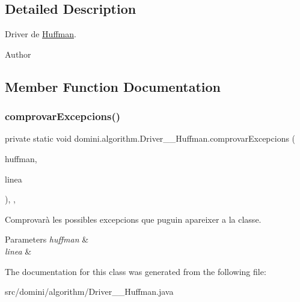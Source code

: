 \subsection{Detailed Description}
Driver de \hyperlink{classdomini_1_1algorithm_1_1Huffman}{Huffman}. 

\begin{DoxyAuthor}{Author}

\end{DoxyAuthor}


\subsection{Member Function Documentation}
\mbox{\label{classdomini_1_1algorithm_1_1Driver____Huffman_a5d56f18f1d8f96dfc735b9a127094319}} 
\subsubsection{\texorpdfstring{comprovar\+Excepcions()}{comprovarExcepcions()}}
{\footnotesize\ttfamily private static void domini.\+algorithm.\+Driver\+\_\+\+\_\+\+Huffman.\+comprovar\+Excepcions (\begin{DoxyParamCaption}\item[{\hyperlink{classdomini_1_1algorithm_1_1Huffman}{Huffman}}]{huffman,  }\item[{String}]{linea }\end{DoxyParamCaption})\hspace{0.3cm}{\ttfamily [inline]}, {\ttfamily [static]}, {\ttfamily [private]}}



Comprovarà les possibles excepcions que puguin apareixer a la classe. 


\begin{DoxyParams}{Parameters}
{\em huffman} & \\
\hline
{\em linea} & \\
\hline
\end{DoxyParams}


The documentation for this class was generated from the following file\+:\begin{DoxyCompactItemize}
\item 
src/domini/algorithm/Driver\+\_\+\+\_\+\+Huffman.\+java\end{DoxyCompactItemize}
